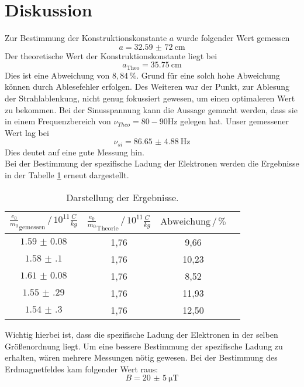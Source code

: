 \section{Diskussion}
Zur Bestimmung der Konstruktionskonstante $a$ wurde
folgender Wert gemessen
\begin{equation*}
    a = \SI{32,59(72)}{\centi\meter}
\end{equation*}
Der theoretische Wert der Konstruktionskonstante liegt bei
\begin{equation*}
   a_{\text{Theo}} = \SI{35.75}{\centi\meter}
\end{equation*}
Dies ist eine Abweichung von $8,84 \, \%$. Grund für eine solch hohe Abweichung
können durch Ablesefehler erfolgen. Des Weiteren war der Punkt, zur Ablesung der
Strahlablenkung, nicht genug fokussiert gewesen, um einen optimaleren Wert zu bekommen.
Bei der Sinusspannung kann die Aussage gemacht werden, dass sie in einem Frequenzbereich
von $\nu_{Theo}=80 - 90 \si{\hertz}$ gelegen hat.
Unser gemessener Wert lag bei
\begin{equation*}
  \nu_{si}= \SI{86.65(488)}{\hertz}
\end{equation*}
Dies deutet auf eine gute Messung hin.\\
Bei der Bestimmung der spezifische Ladung der Elektronen werden die Ergebnisse in der Tabelle \ref{tab:8}
erneut dargestellt.
\begin{table}[H]
  \centering
  \caption{Darstellung der Ergebnisse.}
  \label{tab:8}
  \begin{tabular}{c c c c}
\toprule
$\frac{e_0}{m_0}_{\text{gemessen}}\,/\, 10^{11}\frac{C}{kg}$ & $\frac{e_0}{m_0}_{\text{Theorie}} \,/\, 10^{11}\frac{C}{kg}$& $\text{Abweichung} \,/\, \%$\\
\midrule
$\num{1.59(8)}$ &1,76 &  9,66\\
$\num{1.58(10)}$&1,76 & 10,23\\
$\num{1.61(8)}$ &1,76 &  8,52\\
$\num{1.55(29)}$&1,76 & 11,93\\
$\num{1.54(30)}$&1,76 & 12,50\\
\bottomrule
  \end{tabular}
\end{table}
Wichtig hierbei ist, dass die spezifische Ladung der Elektronen in der selben Größenordnung liegt. Um eine bessere
Bestimmung der spezifische Ladung zu erhalten, wären mehrere Messungen nötig gewesen.
Bei der Bestimmung des Erdmagnetfeldes kam folgender Wert raus:
\begin{equation*}
  B= \SI{20(5)}{\micro\tesla}
\end{equation*}
